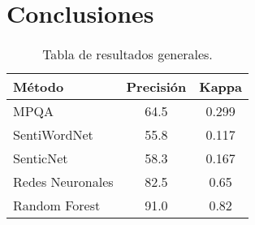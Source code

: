 \section{Conclusiones}

\begin{table}[]
    \begin{tabular}{|l|c|c|}
    \hline
    \textbf{Método}  & \textbf{Precisión} & \textbf{Kappa} \\ \hline
    MPQA             & 64.5               & 0.299          \\ \hline
    SentiWordNet     & 55.8               & 0.117          \\ \hline
    SenticNet        & 58.3               & 0.167          \\ \hline \hline
    Redes Neuronales & 82.5               & 0.65           \\ \hline
    Random Forest    & 91.0               & 0.82           \\ \hline
    \end{tabular}
    \caption{Tabla de resultados generales.}
\end{table}